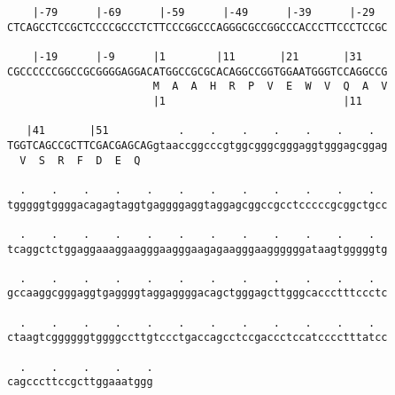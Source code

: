 \documentclass{article}
\begin{document}
\begin{Verbatim}
    |-79      |-69      |-59      |-49      |-39      |-29  
CTCAGCCTCCGCTCCCCGCCCTCTTCCCGGCCCAGGGCGCCGGCCCACCCTTCCCTCCGC
  
    |-19      |-9      |1        |11       |21       |31    
CGCCCCCCGGCCGCGGGGAGGACATGGCCGCGCACAGGCCGGTGGAATGGGTCCAGGCCG
                       M  A  A  H  R  P  V  E  W  V  Q  A  V
                       |1                            |11    
  
   |41       |51           .    .    .    .    .    .    .  
TGGTCAGCCGCTTCGACGAGCAGgtaaccggcccgtggcgggcgggaggtgggagcggag
  V  S  R  F  D  E  Q                                       
  
  .    .    .    .    .    .    .    .    .    .    .    .  
tgggggtggggacagagtaggtgaggggaggtaggagcggccgcctcccccgcggctgcc
  
  .    .    .    .    .    .    .    .    .    .    .    .  
tcaggctctggaggaaaggaagggaagggaagagaagggaaggggggataagtgggggtg
  
  .    .    .    .    .    .    .    .    .    .    .    .  
gccaaggcgggaggtgaggggtaggaggggacagctgggagcttgggcaccctttccctc
  
  .    .    .    .    .    .    .    .    .    .    .    .  
ctaagtcggggggtggggccttgtccctgaccagcctccgaccctccatcccctttatcc
  
  .    .    .    .    .
cagcccttccgcttggaaatggg
\end{Verbatim}
\newpage
\end{document}
